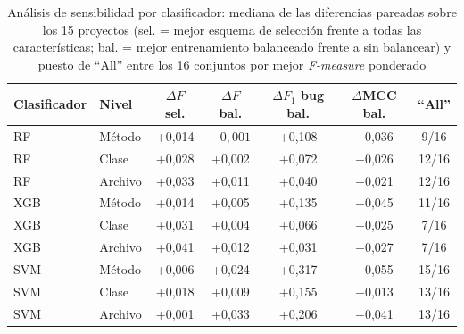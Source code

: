 \begin{table}[H]
\centering
\caption{Análisis de sensibilidad por clasificador: mediana de las diferencias pareadas sobre los 15 proyectos (sel. = mejor esquema de selección frente a todas las características; bal. = mejor entrenamiento balanceado frente a sin balancear) y puesto de ``All'' entre los 16 conjuntos por mejor \textit{F-measure} ponderado}
\label{tab:sensibilidad}
\begin{tabular}{llccccc}
\toprule
Clasificador & Nivel & $\Delta F$ sel. & $\Delta F$ bal. & $\Delta F_{1}$ bug bal. & $\Delta$MCC bal. & ``All'' \\
\midrule
RF  & Método  & +0,014 & $-0{,}001$ & +0,108 & +0,036 & 9/16 \\
RF  & Clase   & +0,028 & +0,002   & +0,072 & +0,026 & 12/16 \\
RF  & Archivo & +0,033 & +0,011   & +0,040 & +0,021 & 12/16 \\
XGB & Método  & +0,014 & +0,005   & +0,135 & +0,045 & 11/16 \\
XGB & Clase   & +0,031 & +0,004   & +0,066 & +0,025 & 7/16 \\
XGB & Archivo & +0,041 & +0,012   & +0,031 & +0,027 & 7/16 \\
SVM & Método  & +0,006 & +0,024   & +0,317 & +0,055 & 15/16 \\
SVM & Clase   & +0,018 & +0,009   & +0,155 & +0,013 & 13/16 \\
SVM & Archivo & +0,001 & +0,033   & +0,206 & +0,041 & 13/16 \\
\bottomrule
\end{tabular}
\end{table}
